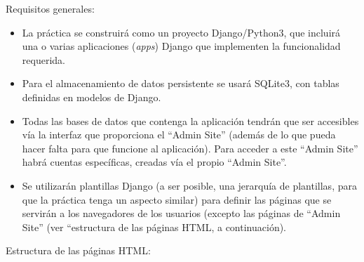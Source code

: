 Requisitos generales:

\begin{itemize}

\item La práctica se construirá como un proyecto Django/Python3, que incluirá una o varias aplicaciones (\emph{apps}) Django que implementen la funcionalidad requerida.

\item Para el almacenamiento de datos persistente se usará SQLite3, con tablas definidas en modelos de Django.

\item Todas las bases de datos que contenga la aplicación tendrán que ser accesibles vía la interfaz que proporciona el ``Admin Site'' (además de lo que pueda hacer falta para que funcione al aplicación). Para acceder a este ``Admin Site'' habrá cuentas específicas, creadas vía el propio ``Admin Site''.

\item Se utilizarán plantillas Django (a ser posible, una jerarquía de plantillas, para que la práctica tenga un aspecto similar) para definir las páginas que se servirán a los navegadores de los usuarios (excepto las páginas de ``Admin Site'' (ver ``estructura de las páginas HTML, a continuación).

\end{itemize}

Estructura de las páginas HTML:


